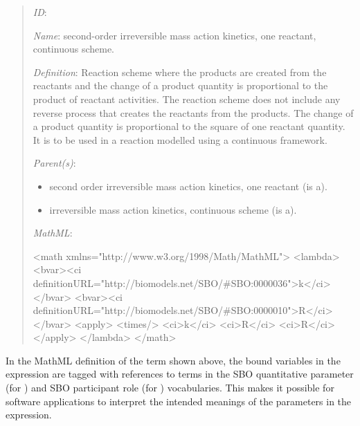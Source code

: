\begin{quote}
\begin{description}

\item \emph{ID}: 

\item \emph{Name}: second-order irreversible mass action kinetics,
  one reactant, continuous scheme.

\item \emph{Definition}: Reaction scheme where the products are
  created from the reactants and the change of a product quantity
  is proportional to the product of reactant activities. The
  reaction scheme does not include any reverse process that
  creates the reactants from the products. The change of a product
  quantity is proportional to the square of one reactant quantity.
  It is to be used in a reaction modelled using a continuous
  framework.

\begin{blockChanged}

\item \emph{Parent(s)}: 
  \begin{itemize}
  \item {} second order irreversible mass action
    kinetics, one reactant (is a).
  \item {}
    irreversible mass action kinetics, continuous scheme (is a).
  \end{itemize}
  
\end{blockChanged}

\item \emph{MathML}:
\begin{example}
<math xmlns="http://www.w3.org/1998/Math/MathML">
        <lambda>
            <bvar><ci definitionURL="http://biomodels.net/SBO/#SBO:0000036">k</ci></bvar>
            <bvar><ci definitionURL="http://biomodels.net/SBO/#SBO:0000010">R</ci></bvar>
            <apply>
                <times/>
                <ci>k</ci>
                <ci>R</ci>
                <ci>R</ci>
            </apply>
        </lambda>
</math>
\end{example}

\end{description}
\end{quote}

In the MathML definition of the term shown above, the bound
variables in the  expression are tagged with
references to terms in the SBO quantitative parameter (for
) and SBO participant role (for ) vocabularies.
This makes it possible for software applications to interpret the
intended meanings of the parameters in the expression.

